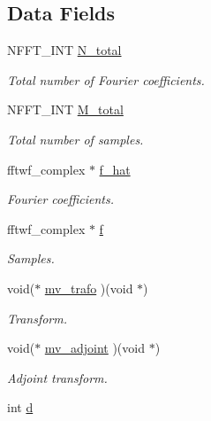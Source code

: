 \subsection*{Data Fields}
\begin{DoxyCompactItemize}
\item 
N\-F\-F\-T\-\_\-\-I\-N\-T \hyperlink{structnsfftf__plan_abd472c8f7183e1721b7d036176497347}{N\-\_\-total}
\begin{DoxyCompactList}\small\item\em Total number of Fourier coefficients. \end{DoxyCompactList}\item 
N\-F\-F\-T\-\_\-\-I\-N\-T \hyperlink{structnsfftf__plan_aec743750e5f2a87a8f60c2d308207530}{M\-\_\-total}
\begin{DoxyCompactList}\small\item\em Total number of samples. \end{DoxyCompactList}\item 
fftwf\-\_\-complex $\ast$ \hyperlink{structnsfftf__plan_a423d4a1555477e49a7cb3c26a4a5dfd1}{f\-\_\-hat}
\begin{DoxyCompactList}\small\item\em Fourier coefficients. \end{DoxyCompactList}\item 
fftwf\-\_\-complex $\ast$ \hyperlink{structnsfftf__plan_aa2cda7d4bb129ad3dfd6b89682c28cd6}{f}
\begin{DoxyCompactList}\small\item\em Samples. \end{DoxyCompactList}\item 
void($\ast$ \hyperlink{structnsfftf__plan_ac698248a376958d67a10beecfdc3aa36}{mv\-\_\-trafo} )(void $\ast$)
\begin{DoxyCompactList}\small\item\em Transform. \end{DoxyCompactList}\item 
void($\ast$ \hyperlink{structnsfftf__plan_a8b4c8c903e7b24610e2d2e0c9bb62705}{mv\-\_\-adjoint} )(void $\ast$)
\begin{DoxyCompactList}\small\item\em Adjoint transform. \end{DoxyCompactList}\item 
\hypertarget{structnsfftf__plan_a161e392c8404d11f3237350b23e8c041}{int \hyperlink{structnsfftf__plan_a161e392c8404d11f3237350b23e8c041}{d}}\label{structnsfftf__plan_a161e392c8404d11f3237350b23e8c041}


\end{DoxyCompactItemize}
